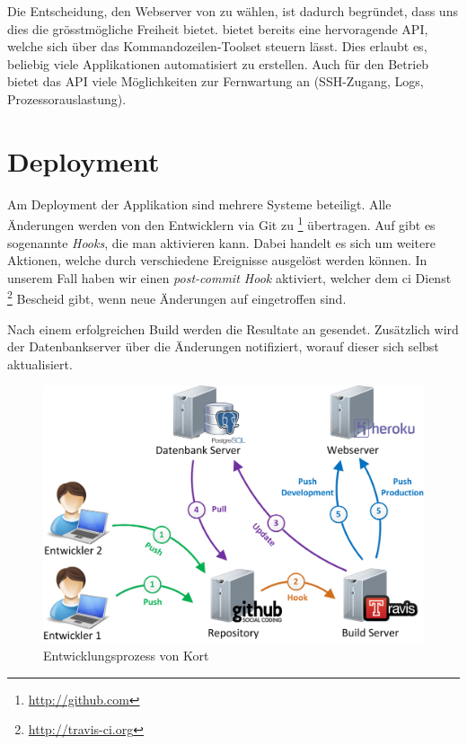 Die Entscheidung, den Webserver von  zu wählen, ist dadurch begründet, dass uns dies die grösstmögliche Freiheit bietet. 
 bietet bereits eine hervoragende \gls{API}, welche sich über das Kommandozeilen-Toolset  steuern lässt.
Dies erlaubt es, beliebig viele Applikationen automatisiert zu erstellen.
Auch für den Betrieb bietet das \gls{API} viele Möglichkeiten zur Fernwartung an (SSH-Zugang, Logs, Prozessorauslastung).

\section{Deployment}
Am Deployment der Applikation sind mehrere Systeme beteiligt. 
Alle Änderungen werden von den Entwicklern via \gls{Git} zu \footnote{\url{http://github.com}} übertragen. 
Auf  gibt es sogenannte \emph{Hooks}, die man aktivieren kann. 
Dabei handelt es sich um weitere Aktionen, welche durch verschiedene Ereignisse ausgelöst werden können. 
In unserem Fall haben wir einen \emph{post-commit Hook} aktiviert, welcher dem \gls{ci} Dienst \footnote{\url{http://travis-ci.org}} Bescheid gibt, wenn neue Änderungen auf  eingetroffen sind.

Nach einem erfolgreichen Build werden die Resultate an  gesendet.
Zusätzlich wird der Datenbankserver über die Änderungen notifiziert, worauf dieser sich selbst aktualisiert.

\begin{figure}[H]
	\centering
	\includegraphics[scale=0.35]{images/implementation/backend/kort-development}
	\caption{Entwicklungsprozess von Kort}
	\label{image-kort-development}
\end{figure}

